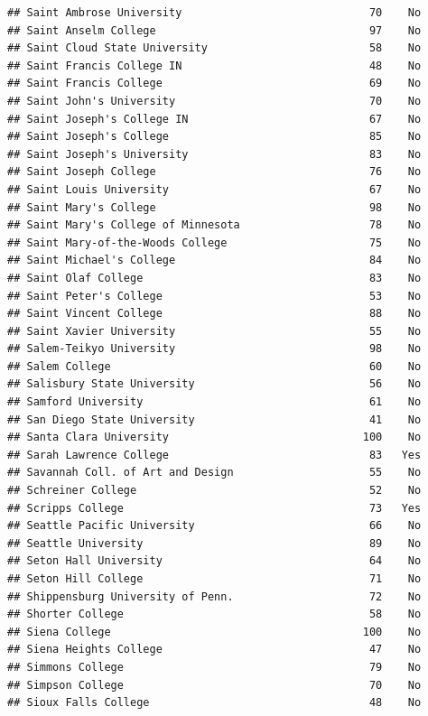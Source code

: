 \documentclass[
]{article}
\begin{document}
\begin{verbatim}
## Saint Ambrose University                             70    No
## Saint Anselm College                                 97    No
## Saint Cloud State University                         58    No
## Saint Francis College IN                             48    No
## Saint Francis College                                69    No
## Saint John's University                              70    No
## Saint Joseph's College IN                            67    No
## Saint Joseph's College                               85    No
## Saint Joseph's University                            83    No
## Saint Joseph College                                 76    No
## Saint Louis University                               67    No
## Saint Mary's College                                 98    No
## Saint Mary's College of Minnesota                    78    No
## Saint Mary-of-the-Woods College                      75    No
## Saint Michael's College                              84    No
## Saint Olaf College                                   83    No
## Saint Peter's College                                53    No
## Saint Vincent College                                88    No
## Saint Xavier University                              55    No
## Salem-Teikyo University                              98    No
## Salem College                                        60    No
## Salisbury State University                           56    No
## Samford University                                   61    No
## San Diego State University                           41    No
## Santa Clara University                              100    No
## Sarah Lawrence College                               83   Yes
## Savannah Coll. of Art and Design                     55    No
## Schreiner College                                    52    No
## Scripps College                                      73   Yes
## Seattle Pacific University                           66    No
## Seattle University                                   89    No
## Seton Hall University                                64    No
## Seton Hill College                                   71    No
## Shippensburg University of Penn.                     72    No
## Shorter College                                      58    No
## Siena College                                       100    No
## Siena Heights College                                47    No
## Simmons College                                      79    No
## Simpson College                                      70    No
## Sioux Falls College                                  48    No

\end{verbatim}
\end{document}
